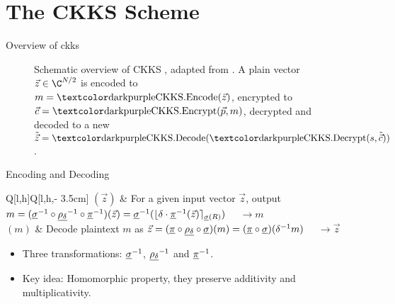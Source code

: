 \section{The CKKS Scheme}
\begin{frame}{Overview of \gls{ckks}}
  \begin{figure}[H]
    \centering
    \caption[Schematic overview of the CKKS scheme]{
      Schematic overview of CKKS \parencite{2017-ckks-original}, adapted from \cite{2020-cryptotree}.
      A plain vector $\vec{z} \in \C^{N/2}$ is encoded to $m = \cryptop{CKKS.Encode}(\vec{z})$, encrypted to $\vec{c} = \cryptop{CKKS.Encrypt}(\vec{p}, m)$, decrypted and decoded to a new $\tilde{\vec{z}} = \cryptop{CKKS.Decode}(\cryptop{CKKS.Decrypt}(s, \tilde{\vec{c}}))$.
    }
    \label{fig:ckks-overview}
  \end{figure}
\end{frame}

\begin{frame}{Encoding and Decoding}
   \\
  \begin{tblr}{Q[l,h]Q[l,h,\textwidth - 3.5cm]}
    $(\vec{z})$ & {For a given input vector $\vec{z}$, output
        $m = (\underline{\sigma}^{-1} \circ \underline{\rho_\delta}^{-1} \circ \underline{\pi}^{-1})(\vec{z}) = \underline{\sigma}^{-1}(\lfloor \delta \cdot \underline{\pi}^{-1}(\vec{z})\rceil_{\underline{\sigma}(R)})$ $\quad\rightarrow m$} \\
    $(m)$ & {Decode plaintext $m$ as
        $\vec{z} = (\underline{\pi} \circ \underline{\rho_\delta} \circ \underline{\sigma})(m) = (\underline{\pi} \circ \underline{\sigma})(\delta^{-1} m)$
        $\quad\rightarrow \vec{z}$} \\
  \end{tblr}
  \begin{itemize}
    \item Three transformations: $\underline{\sigma}^{-1}$, $\underline{\rho_\delta}^{-1}$ and $\underline{\pi}^{-1}$.
    \item Key idea: Homomorphic property, they preserve additivity and multiplicativity.
  \end{itemize}
\end{frame}

